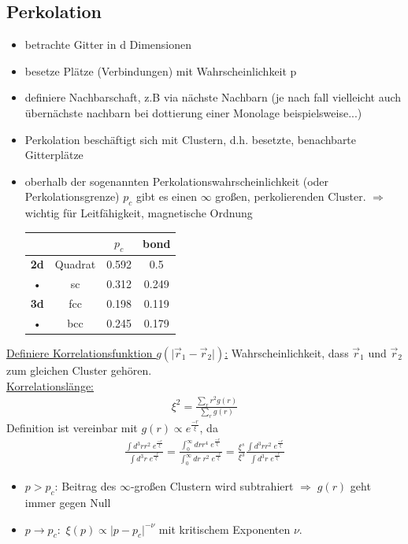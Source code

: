 \documentclass[12pt]{article}
\begin{document}
 \subsection{Perkolation}
 	\begin{itemize}
 	\item betrachte Gitter in d Dimensionen
 	\item besetze Plätze (Verbindungen) mit Wahrscheinlichkeit p
 	\item definiere Nachbarschaft, z.B via nächste Nachbarn
 	(je nach fall vielleicht auch übernächste nachbarn bei dottierung einer Monolage beispielsweise...)
 	\item Perkolation beschäftigt sich mit Clustern, d.h.  besetzte, benachbarte Gitterplätze
 	\item oberhalb der sogenannten Perkolationswahrscheinlichkeit (oder Perkolationsgrenze) $p_c$ gibt es einen $\infty$ großen, perkolierenden Cluster. 
 	$\Rightarrow$ wichtig für Leitfähigkeit, magnetische Ordnung
 	\begin{tabular}{|c|c|c|c|}
 	\hline 
 	 &  & $p_c$ & bond \\ 
 	\hline 
 	\textbf{2d} & Quadrat & 0.592 & 0.5 \\ 
 	\hline 
 	• & sc & 0.312 & 0.249 \\ 
 	\hline 
 	\textbf{3d} & fcc & 0.198 & 0.119 \\ 
 	\hline 
 	• & bcc & 0.245 & 0.179 \\ 
 	\hline 
 	\end{tabular} 
 	\end{itemize}
 	\underline{Definiere Korrelationsfunktion $g( \vert \vec{r}_1 - \vec{r}_2 \vert)$:} Wahrscheinlichkeit, dass $\vec{r}_1$ und $\vec{r}_2$ zum gleichen Cluster gehören. \\
 	\underline{Korrelationslänge:}
 	 \begin{align}
 	\xi^2= \frac{\sum_r r^2 g(r)}{\sum_r g(r)}
 	\end{align}
 	Definition ist vereinbar mit $g(r) \propto e^\frac{-r}{\xi}$, da 
 	\begin{align}
 	\frac{\int d^3r r^2 \; e^\frac{-r}{\xi}}{\int d^3 r \; e^\frac{-r}{\xi}}
 	= \frac{\int_0^\infty dr r^4 \; e^\frac{-r}{\xi}}{\int_0^\infty d r \; r^2 \; e^\frac{-r}{\xi}}
 	= \frac{\xi^s}{\xi^3}  \frac{\int d^3r r^2 \; e^\frac{-r}{\xi}}{\int d^3 r \; e^\frac{-r}{\xi}}
 	\end{align}
 	\begin{itemize}
 	\item $p>p_c$: Beitrag des $\infty$-großen Clustern wird subtrahiert $\Rightarrow \; g(r)$ geht immer gegen Null
 	\item $p \to p_c:$ $\xi(p) \propto \vert p-p_c \vert^{-\nu}$ mit kritischem Exponenten $\nu$.
 	
 	\end{itemize}
\end{document}
